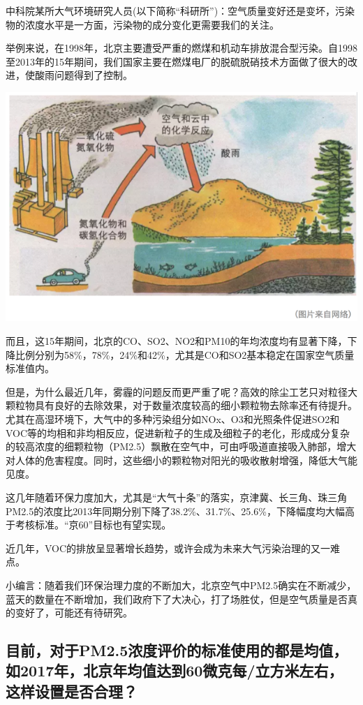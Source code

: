 \documentclass[]{book}
\begin{document}
中科院某所大气环境研究人员(以下简称``科研所'')：空气质量变好还是变坏，污染物的浓度水平是一方面，污染物的成分变化更需要我们的关注。

举例来说，在1998年，北京主要遭受严重的燃煤和机动车排放混合型污染。自1998至2013年的15年期间，我们国家主要在燃煤电厂的脱硫脱硝技术方面做了很大的改进，使酸雨问题得到了控制。

\includegraphics[width=8.33in]{images/air2}

而且，这15年期间，北京的CO、SO2、NO2和PM10的年均浓度均有显著下降，下降比例分别为58\%，78\%，24\%和42\%，尤其是CO和SO2基本稳定在国家空气质量标准值内。

但是，为什么最近几年，雾霾的问题反而更严重了呢？高效的除尘工艺只对粒径大颗粒物具有良好的去除效果，对于数量浓度较高的细小颗粒物去除率还有待提升。尤其在高湿环境下，大气中的多种污染组分如NOx、O3和光照条件促进SO2和VOC等的均相和非均相反应，促进新粒子的生成及细粒子的老化，形成成分复杂的较高浓度的细颗粒物（PM2.5）飘散在空气中，可由呼吸道直接吸入肺部，增大对人体的危害程度。同时，这些细小的颗粒物对阳光的吸收散射增强，降低大气能见度。

这几年随着环保力度加大，尤其是``大气十条''的落实，京津冀、长三角、珠三角PM2.5的浓度比2013年同期分别下降了38.2\%、31.7\%、25.6\%，下降幅度均大幅高于考核标准。``京60''目标也有望实现。

近几年，VOC的排放呈显著增长趋势，或许会成为未来大气污染治理的又一难点。

小编言：随着我们环保治理力度的不断加大，北京空气中PM2.5确实在不断减少，蓝天的数量在不断增加，我们政府下了大决心，打了场胜仗，但是空气质量是否真的变好了，可能还有待研究。

\subsection{目前，对于PM2.5浓度评价的标准使用的都是均值，如2017年，北京年均值达到60微克每/立方米左右，这样设置是否合理？}\label{pm2.5201760}
\end{document}
